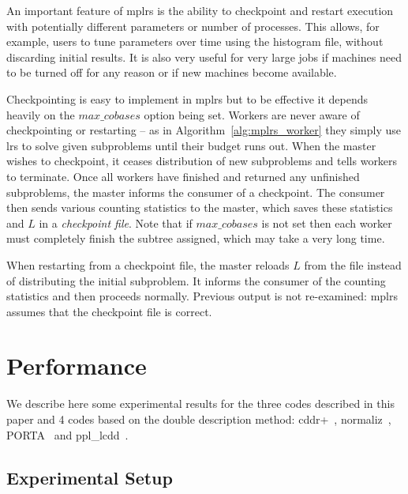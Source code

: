 \documentclass[a4paper,11pt]{article}   \usepackage{authblk} \usepackage[top=1.9cm,bottom=1.9cm,left=1.9cm,right=1.9cm]{geometry}
\newcommand{\progname}{\textsf}
\newcommand{\lrs}{\progname{lrs}\xspace}
\newcommand{\mplrs}{\progname{mplrs}\xspace}
\newcommand{\norm}{\progname{normaliz}\xspace}
\newcommand{\cdd}{\progname{cddr+}\xspace}
\newcommand{\porta}{\progname{PORTA}\xspace}
\newcommand{\ppl}{\progname{ppl\_lcdd}\xspace}
\newcommand{\maxcobases}{\ensuremath{\mathit{max\_cobases}}\xspace}
\begin{document}
An important feature of \mplrs is the ability to
checkpoint and restart execution with potentially different
parameters or number of processes.  This allows, for example, users
to tune parameters over time using the histogram file, without discarding
initial results. It is also very useful for very large jobs
if machines need to be
turned off for any reason or if new machines become available.

Checkpointing is easy to implement in \mplrs but to be effective
it depends heavily on the \maxcobases option being set.  
Workers are never aware of
checkpointing or restarting -- as in Algorithm~\ref{alg:mplrs_worker} they 
simply use \lrs to solve given subproblems until their budget runs out.
When the master wishes to checkpoint, it ceases distribution of new subproblems
and tells workers to terminate.  Once all workers have finished and returned
any unfinished subproblems, the master informs the consumer of a checkpoint.
The consumer then sends various counting statistics to the master, which
saves these statistics and $L$ in a \emph{checkpoint file}.
Note that if \maxcobases is not set then each worker must completely
finish the subtree assigned, which may take a very long time.

When restarting from a checkpoint file, the master reloads $L$ from the
file instead of
distributing the initial subproblem.  It informs the consumer of the counting
statistics and then proceeds normally.  Previous output is not re-examined: 
\mplrs assumes that the checkpoint file is correct.

\section{Performance}
\label{sec:experiments}

We describe here some experimental results for the
three codes described in this paper and 4 codes based on the double description method:
\cdd~\cite{cdd}, \norm~\cite{norm}, \porta~\cite{porta} and \ppl~\cite{ppl}.

\subsection{Experimental Setup}
\label{subsec:expsetup}
\end{document}
